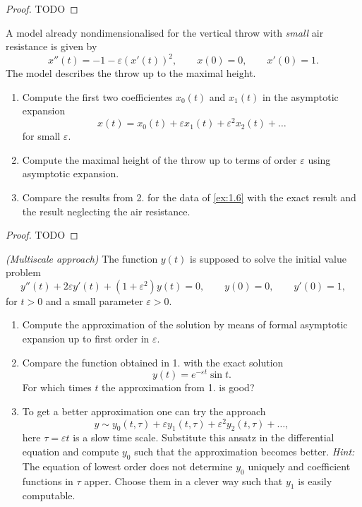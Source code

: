 \begin{proof}
  TODO
\end{proof}

\begin{ex}
  [1.9]

  A model already nondimensionalised for the vertical throw with \textit{small}
  air resistance is given by
  \[
    x''(t) = -1 - \varepsilon(x'(t))^2,\qquad
    x(0) = 0,\qquad
    x'(0) = 1.
  \]
  The model describes the throw up to the maximal height.

  \begin{enumerate}
    \item Compute the first two coefficientes $x_0(t)$ and $x_1(t)$ in the asymptotic expansion
      \[
        x(t) = x_0(t) + \varepsilon x_1(t) + \varepsilon^2 x_2(t) + \dots
      \]
      for small $\varepsilon$.
    \item Compute the maximal height of the throw up to terms of order
      $\varepsilon$ using asymptotic expansion.
    \item Compare the results from 2. for the data of \autoref{ex:1.6} with the
      exact result and the result neglecting the air resistance.
  \end{enumerate}
\end{ex}

\begin{proof}
  TODO
\end{proof}

\begin{ex}
  [1.10]

  \textit{(Multiscale approach)} The function $y(t)$ is supposed to solve the initial value problem
  \[
    y''(t) + 2 \varepsilon y'(t) + (1 + \varepsilon^2)y(t) = 0,\qquad
    y(0) = 0,\qquad
    y'(0) = 1,
  \]
  for $t > 0$ and a small parameter $\varepsilon > 0$.
  \begin{enumerate}
    \item Compute the approximation of the solution by means of formal
      asymptotic expansion up to first order in $\varepsilon$.
    \item Compare the function obtained in 1. with the exact solution
      \[
        y(t) = e^{-\varepsilon t} \sin t.
      \]
      For which times $t$ the approximation from 1. is good?
    \item To get a better approximation one can try the approach
      \[
        y \sim y_0(t, \tau) + \varepsilon y_1(t, \tau) + \varepsilon^2 y_2(t, \tau) + \dots,
      \]
      here $\tau = \varepsilon t$ is a slow time scale.
      Substitute this ansatz in the differential equation and compute $y_0$
      such that the approximation becomes better.
      \textit{Hint:} The equation of lowest order does not determine $y_0$
      uniquely and coefficient functions in $\tau$ apper. Choose them in a
      clever way such that $y_1$ is easily computable.
  \end{enumerate}
  
\end{ex}





